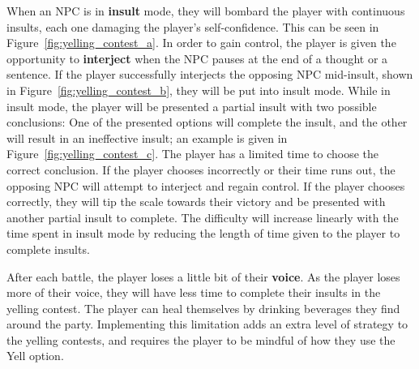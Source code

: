 When an NPC is in \textbf{insult} mode, they will bombard the player with continuous insults, each one damaging the player's self-confidence. This can be seen in Figure~\ref{fig:yelling_contest_a}. In order to gain control, the player is given the opportunity to \textbf{interject} when the NPC pauses at the end of a thought or a sentence. If the player successfully interjects the opposing NPC mid-insult, shown in Figure~\ref{fig:yelling_contest_b}, they will be put into insult mode. While in insult mode, the player will be presented a partial insult with two possible conclusions: One of the presented options will complete the insult, and the other will result in an ineffective insult; an example is given in Figure~\ref{fig:yelling_contest_c}. The player has a limited time to choose the correct conclusion. If the player chooses incorrectly or their time runs out, the opposing NPC will attempt to interject and regain control. If the player chooses correctly, they will tip the scale towards their victory and be presented with another partial insult to complete. The difficulty will increase linearly with the time spent in insult mode by reducing the length of time given to the player to complete insults.

After each battle, the player loses a little bit of their \textbf{voice}. As the player loses more of their voice, they will have less time to complete their insults in the yelling contest. The player can heal themselves by drinking beverages they find around the party. Implementing this limitation adds an extra level of strategy to the yelling contests, and requires the player to be mindful of how they use the Yell option.

